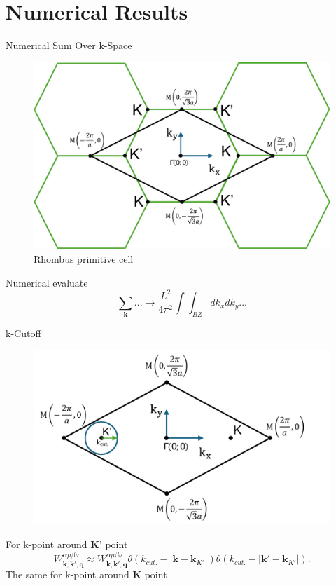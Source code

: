 \documentclass{beamer}
\begin{document}
\section{Numerical Results}
	\begin{frame}{Numerical Sum Over k-Space}
		\begin{figure}
\includegraphics[width=0.5\linewidth]{images/Rhombus.pdf}
\caption{Rhombus primitive cell}
\end{figure}
Numerical evaluate
		\begin{equation}
			\sum_{\textbf{k}} ... \to \frac{L^2}{4\pi^2} \int \int_{BZ} dk_x dk_y...
		\end{equation}
	\end{frame}
	\begin{frame}{k-Cutoff}
	\begin{figure}
		\includegraphics[width=0.75\linewidth]{images/kcutoff.pdf}
	\end{figure}
For k-point around \textbf{K}' point
	\begin{equation}
		W^{\alpha \mu \beta \nu}_{\textbf{k},\textbf{k}',\textbf{q}} \approx W^{\alpha \mu \beta \nu}_{\textbf{k},\textbf{k}',\textbf{q}} \theta(k_{cut.} - |\textbf{k} - \textbf{k}_{K'}|) \theta(k_{cut.} - |\textbf{k}' - \textbf{k}_{K'}|).
	\end{equation}
	The same for k-point around \textbf{K} point
	\end{frame}
\end{document}
